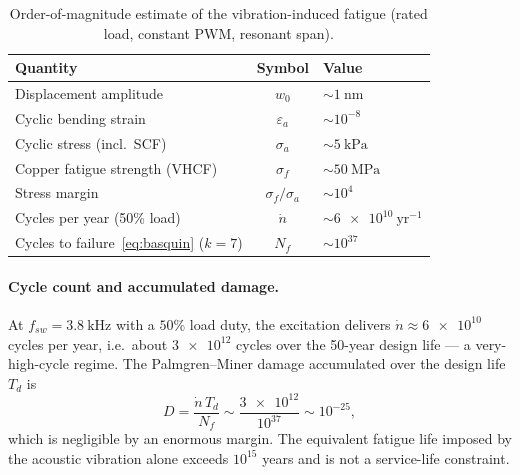 \begin{table}[h]
\centering
\caption{Order-of-magnitude estimate of the vibration-induced fatigue (rated load,
constant PWM, resonant span).}
\label{tab:fatigue}
\begin{tabular}{@{}lcl@{}}
\toprule
Quantity & Symbol & Value \\
\midrule
Displacement amplitude & $w_0$ & $\sim\SI{1}{\nano\meter}$ \\
Cyclic bending strain & $\varepsilon_a$ & $\sim 10^{-8}$ \\
Cyclic stress (incl.\ SCF) & $\sigma_a$ & $\sim\SI{5}{\kilo\pascal}$ \\
Copper fatigue strength (VHCF) & $\sigma_f$ & $\sim\SI{50}{\mega\pascal}$ \\
Stress margin & $\sigma_f/\sigma_a$ & $\sim 10^{4}$ \\
Cycles per year (50\% load) & $\dot n$ & $\sim\num{6e10}\ \mathrm{yr^{-1}}$ \\
Cycles to failure~\eqref{eq:basquin} ($k=7$) & $N_f$ & $\sim 10^{37}$ \\
\bottomrule
\end{tabular}
\end{table}

\paragraph{Cycle count and accumulated damage.}
At $f_{sw}=\SI{3.8}{\kilo\hertz}$ with a $50\%$ load duty, the excitation delivers
$\dot n\approx\num{6e10}$ cycles per year, i.e.\ about $\num{3e12}$ cycles over the
\num{50}-year design life --- a very-high-cycle regime. The Palmgren--Miner damage
accumulated over the design life $T_d$ is
\begin{equation}
	D = \frac{\dot n\,T_d}{N_f} \sim \frac{\num{3e12}}{10^{37}} \sim 10^{-25},
	\label{eq:miner}
\end{equation}
which is negligible by an enormous margin. The equivalent fatigue life imposed by
the acoustic vibration alone exceeds $10^{15}$ years and is not a service-life
constraint.

